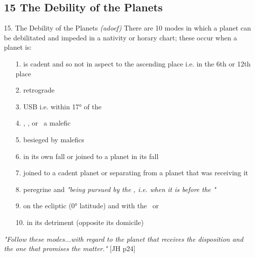 \subsection{15 The Debility of the Planets}
\begin{frame}[t]{15. The Debility of the Planets}
\small
\vspace{-0.2cm}
\textsl{(adoef)} There are 10 modes in which a planet can be debilitated and impeded in a nativity or horary chart; these occur when a planet is:
\vspace{-0.25cm}
\begin{enumerate}
\item[1.] is cadent and so not in aspect to the ascending place i.e. in the 6th or 12th place
\item[2.] retrograde
\item[3.] USB i.e. within 17° of the \Sun
\item[4.] \Conjunction, \Square, or \Opposition\ a malefic
\item[5.] besieged by malefics
\item[6.] in its own fall or joined to a planet in its fall
\item[7.] joined to a cadent planet or separating from a planet that was receiving it
\item[8.] peregrine and \textsl{"being pursued by the \Sun, i.e. when it is before the \Sun"}\footnotemark[1]
\item[9.] on the ecliptic (0° latitude) and with the \NorthNode\ or \SouthNode
\item[10.] in its detriment (opposite its domicile) 
\end{enumerate}
\vspace{-0.2cm}
\footnotesize
\textsl{"Follow these modes...with regard to the planet that receives the disposition and the one that promises the matter."} [JH p24]


\end{frame}
